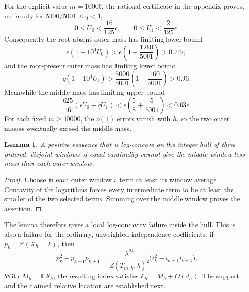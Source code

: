 \documentclass[11pt]{article}
\newtheorem{lemma}[theorem]{Lemma}
\newcommand{\E}{\mathbb E}
\newcommand{\Prob}{\mathbb P}
\begin{document}
For the explicit value $m=10000$, the rational certificate in the appendix proves, uniformly for $5000/5001\le q<1$,
\begin{equation}\label{eq:bounds}
 0\le U_0<\frac{16}{125}\epsilon,\qquad
 0\le U_1<\frac{2}{125}\epsilon.
\end{equation}
Consequently the root-absent outer mass has limiting lower bound
\[
 \epsilon(1-10^4 U_0)>
 \epsilon\left(1-\frac{1280}{5001}\right)>0.74\epsilon,
\]
and the root-present outer mass has limiting lower bound
\[
 q(1-10^4 U_1)>
 \frac{5000}{5001}\left(1-\frac{160}{5001}\right)>0.96.
\]
Meanwhile the middle mass has limiting upper bound
\[
 \frac{625}{16}(\epsilon U_0+qU_1)
 <\epsilon\left(\frac58+\frac5{5001}\right)<0.63\epsilon.
\]
For each fixed $m\ge10000$, the $o(1)$ errors vanish with $h$, so the two outer masses eventually exceed the middle mass.

\begin{lemma}\label{lem:valley}
A positive sequence that is log-concave on the integer hull of three ordered, disjoint windows of equal cardinality cannot give the middle window less mass than each outer window.
\end{lemma}
\begin{proof}
Choose in each outer window a term at least its window average. Concavity of the logarithms forces every intermediate term to be at least the smaller of the two selected terms. Summing over the middle window proves the assertion.
\end{proof}

The lemma therefore gives a local log-concavity failure inside the hull. This is also a failure for the ordinary, unweighted independence coefficients: if $p_k=\Prob(X_h=k)$, then
\[
 p_k^2-p_{k-1}p_{k+1}
 =\frac{\lambda^{2k}}{Z(T_{m,h};\lambda)^2}
   \bigl(i_k^2-i_{k-1}i_{k+1}\bigr).
\]
With $M_h=\E X_h$, the resulting index satisfies $k_h=M_h+O(d_h)$. The support and the claimed relative location are established next.
\end{document}
